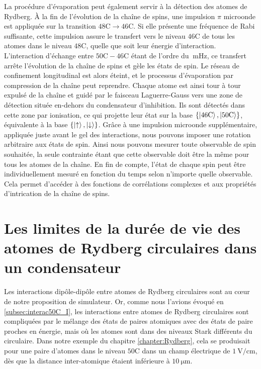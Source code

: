 La procédure d'évaporation peut également servir à la détection des atomes de Rydberg.
\`A la fin de l'évolution de la chaîne de spins, une impulsion $\pi$ microonde est appliquée sur la transition $\mathrm{48C}\rightarrow\mathrm{46C}$.
Si elle présente une fréquence de Rabi suffisante, cette impulsion assure le transfert vers le niveau $\mathrm{46C}$ de tous les atomes dans le niveau $\mathrm{48C}$, quelle que soit leur énergie d'interaction.
L'interaction d'échange entre $\mathrm{50C}-\mathrm{46C}$ étant de l'ordre du $\SI{}{\milli\hertz}$, ce transfert arrête l'évolution de la chaîne de spins et \og gèle \fg{} les états de spin.
Le réseau de confinement longitudinal est alors éteint, et le processus d'évaporation par compression de la chaîne peut reprendre.
Chaque atome est ainsi tour à tour expulsé de la chaîne et guidé par le faisceau Laguerre-Gauss vers une zone de détection située en-dehors du condensateur d'inhibition.
Ils sont détectés dans cette zone par ionisation, ce qui projette leur état sur la base $\{\ket{\mathrm{46C}},\ket{\mathrm{50C}}\}$, équivalente à la base $\{\ket{\uparrow},\ket{\downarrow} \}$.
Grâce à une impulsion microonde supplémentaire, appliquée juste avant le gel des interactions, nous pouvons imposer une rotation arbitraire aux états de spin. Ainsi nous pouvons mesurer toute observable de spin souhaitée, la seule contrainte étant que cette observable doit être la même pour tous les atomes de la chaîne.
En fin de compte, l'état de chaque spin peut être individuellement mesuré en fonction du temps selon n'importe quelle observable.
Cela permet d'accéder à des fonctions de corrélations complexes et aux propriétés d'intrication de la chaîne de spins.

\section{Les limites de la durée de vie des atomes de Rydberg circulaires dans un condensateur}
\noindent Les interactions dipôle-dipôle entre atomes de Rydberg circulaires sont au c\oe ur de notre proposition de simulateur.
Or, comme nous l'avions évoqué en \ref{subsec:interac50C_I}, les interactions entre atomes de Rydberg circulaires sont compliquées par le mélange des états de paires atomiques avec des états de paire proches en énergie, mais où les atomes sont dans des niveaux Stark différents du circulaire.
Dans notre exemple du chapitre \ref{chapter:Rydberg}, cela se produisait pour une paire d'atomes dans le niveau $\mathrm{50C}$ dans un champ électrique de $\SI{1}{\V/\cm}$, dès que la distance inter-atomique étaient inférieure à $\SI{10}{\um}$.

